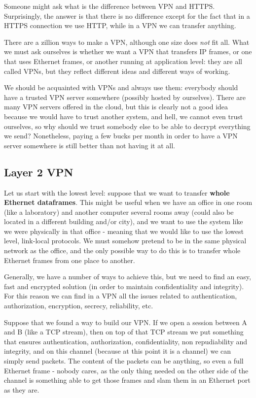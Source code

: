Someone might ask what is the difference between VPN and HTTPS. Surprisingly, the answer is that there is no difference except for the fact that in a HTTPS connection we use HTTP, while in a VPN we can transfer anything.

There are a zillion ways to make a VPN, although one size does \textit{not} fit all. What we must ask ourselves is whether we want a VPN that transfers IP frames, or one that uses Ethernet frames, or another running at application level: they are all called VPNs, but they reflect different ideas and different ways of working.

We should be acquainted with VPNs and always use them: everybody should have a trusted VPN server somewhere (possibly hosted by ourselves). There are many VPN servers offered in the cloud, but this is clearly not a good idea because we would have to trust another system, and hell, we cannot even trust ourselves, so why should we trust somebody else to be able to decrypt everything we send? Nonetheless, paying a few bucks per month in order to have a VPN server somewhere is still better than not having it at all.


\subsection{Layer 2 VPN}
Let us start with the lowest level: suppose that we want to transfer \textbf{whole Ethernet dataframes}. This might be useful when we have an office in one room (like a laboratory) and another computer several rooms away (could also be located in a different building and/or city), and we want to use the system like we were physically in that office - meaning that we would like to use the lowest level, link-local protocols. We must somehow pretend to be in the same physical network as the office, and the only possible way to do this is to transfer whole Ethernet frames from one place to another.

Generally, we have a number of ways to achieve this, but we need to find an easy, fast and encrypted solution (in order to maintain confidentiality and integrity). For this reason we can find in a VPN all the issues related to authentication, authorization, encryption, secrecy, reliability, etc.

Suppose that we found a way to build our VPN. If we open a session between A and B (like a TCP stream), then on top of that TCP stream we put something that ensures authentication, authorization, confidentiality, non repudiability and integrity, and on this channel (because at this point it is a channel) we can simply send packets. The content of the packets can be anything, so even a full Ethernet frame - nobody cares, as the only thing needed on the other side of the channel is something able to get those frames and slam them in an Ethernet port as they are.
 
